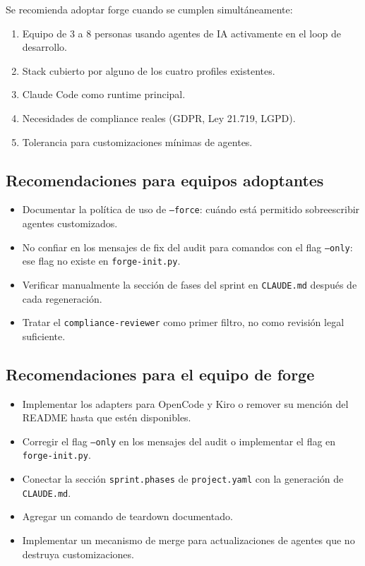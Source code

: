 \documentclass[12pt,a4paper]{article}
\begin{document}
Se recomienda adoptar forge cuando se cumplen simultáneamente:

\begin{enumerate}
  \item Equipo de 3 a 8 personas usando agentes de IA activamente en el loop de desarrollo.
  \item Stack cubierto por alguno de los cuatro profiles existentes.
  \item Claude Code como runtime principal.
  \item Necesidades de compliance reales (GDPR, Ley 21.719, LGPD).
  \item Tolerancia para customizaciones mínimas de agentes.
\end{enumerate}

\subsection{Recomendaciones para equipos adoptantes}

\begin{itemize}
  \item Documentar la política de uso de \texttt{--force}: cuándo está permitido
        sobreescribir agentes customizados.
  \item No confiar en los mensajes de fix del audit para comandos con el flag
        \texttt{--only}: ese flag no existe en \texttt{forge-init.py}.
  \item Verificar manualmente la sección de fases del sprint en \texttt{CLAUDE.md}
        después de cada regeneración.
  \item Tratar el \texttt{compliance-reviewer} como primer filtro, no como revisión
        legal suficiente.
\end{itemize}

\subsection{Recomendaciones para el equipo de forge}

\begin{itemize}
  \item Implementar los adapters para OpenCode y Kiro o remover su mención del
        README hasta que estén disponibles.
  \item Corregir el flag \texttt{--only} en los mensajes del audit o implementar
        el flag en \texttt{forge-init.py}.
  \item Conectar la sección \texttt{sprint.phases} de \texttt{project.yaml} con
        la generación de \texttt{CLAUDE.md}.
  \item Agregar un comando de teardown documentado.
  \item Implementar un mecanismo de merge para actualizaciones de agentes que no
        destruya customizaciones.
\end{itemize}
\end{document}
